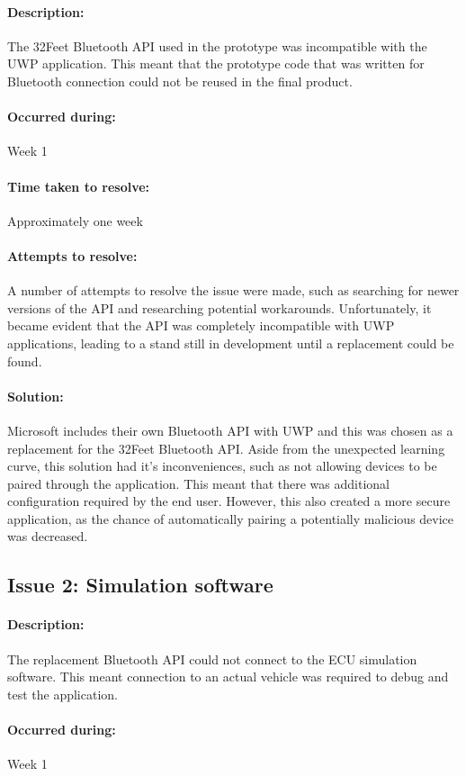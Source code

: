 		\paragraph{Description:}{
		The 32Feet Bluetooth API used in the prototype was incompatible with the UWP application. This meant that the prototype code that was written for Bluetooth connection could not be reused in the final product.
		}
		\paragraph{Occurred during:}{
		Week 1
		}
		\paragraph{Time taken to resolve:}{
		Approximately one week
		}
		\paragraph{Attempts to resolve:}{
		A number of attempts to resolve the issue were made, such as searching for newer versions of the API and researching potential workarounds. Unfortunately, it became evident that the API was completely incompatible with UWP applications, leading to a stand still in development until a replacement could be found.
		}
		\paragraph{Solution:}{
		Microsoft includes their own Bluetooth API with UWP and this was chosen as a replacement for the 32Feet Bluetooth API. Aside from the unexpected learning curve, this solution had it's inconveniences, such as not allowing devices to be paired through the application. This meant that there was additional configuration required by the end user. However, this also created a more secure application, as the chance of automatically pairing a potentially malicious device was decreased.
		}
	\subsection{Issue 2: Simulation software}
		\paragraph{Description:}{
		The replacement Bluetooth API could not connect to the ECU simulation software. This meant connection to an actual vehicle was required to debug and test the application.
		}
		\paragraph{Occurred during:}{
		Week 1
		}
